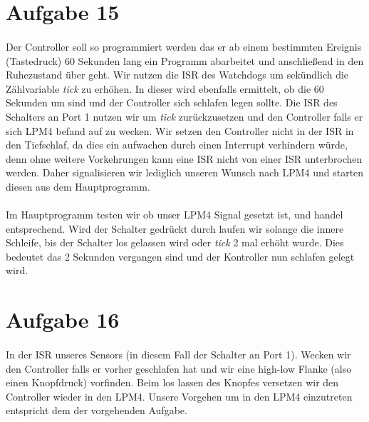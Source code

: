 \section*{Aufgabe 15}

\paragraph*{}
Der Controller soll so programmiert werden das er ab einem bestimmten Ereignis (Tastedruck) 60 Sekunden lang ein Programm abarbeitet und anschließend in den Ruhezustand über geht. Wir nutzen die ISR des Watchdogs um sekündlich die Zählvariable {\em tick} zu erhöhen. In dieser wird ebenfalls ermittelt, ob die 60 Sekunden um sind und der Controller sich schlafen legen sollte. Die ISR des Schalters an Port 1 nutzen wir um {\em tick} zurückzusetzen und den Controller falls er sich LPM4 befand auf zu wecken. Wir setzen den Controller nicht in der ISR in den Tiefschlaf, da dies ein aufwachen durch einen Interrupt verhindern würde, denn ohne weitere Vorkehrungen kann eine ISR nicht von einer ISR unterbrochen werden. Daher signalisieren wir lediglich unseren Wunsch nach LPM4 und starten diesen aus dem Hauptprogramm. \\



\paragraph*{}
Im Hauptprogramm testen wir ob unser LPM4 Signal gesetzt ist, und handel entsprechend. Wird der Schalter gedrückt durch laufen wir solange die innere Schleife, bis der Schalter los gelassen wird oder {\em tick} 2 mal erhöht wurde. Dies bedeutet das 2 Sekunden vergangen sind und der Kontroller nun schlafen gelegt wird. \\



\section*{Aufgabe 16}

\paragraph*{}
 In der ISR unseres Sensors (in diesem Fall der Schalter an Port 1). Wecken wir den Controller falls er vorher geschlafen hat und wir eine high-low Flanke (also einen Knopfdruck) vorfinden. Beim los lassen des Knopfes versetzen wir den Controller wieder in den LPM4. Unsere Vorgehen um in den LPM4 einzutreten entspricht dem der vorgehenden Aufgabe.\\ 

